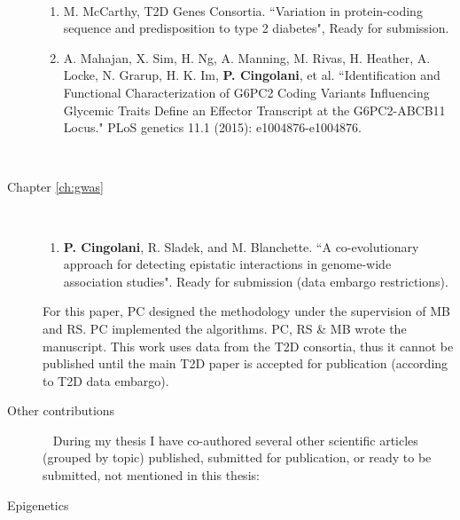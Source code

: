 \begin{description}
		~ \\
			
		\begin{enumerate}[resume]
		
			\item M. McCarthy, T2D Genes Consortia. ``Variation in protein-coding sequence and predisposition to type 2 diabetes", Ready for submission.
			
			\item A. Mahajan, X. Sim, H. Ng, A. Manning, M. Rivas, H. Heather, A. Locke, N. Grarup, H. K. Im, \textbf{P. Cingolani}, et al. ``Identification and Functional Characterization of G6PC2 Coding Variants Influencing Glycemic Traits Define an Effector Transcript at the G6PC2-ABCB11 Locus." PLoS genetics 11.1 (2015): e1004876-e1004876.
		
		\end{enumerate}
		~ \\
	
	\item[Chapter \ref{ch:gwas}] ~
	
		\begin{enumerate}[resume]
		\item \textbf{P. Cingolani}, R. Sladek, and M. Blanchette. ``A co-evolutionary approach for detecting epistatic interactions in genome-wide association studies". Ready for submission (data embargo restrictions).
		\end{enumerate}
	
		For this paper, PC designed the methodology under the supervision of MB and RS. PC implemented the algorithms. PC, RS \& MB wrote the manuscript. This work uses data from the T2D consortia, thus it cannot be published until the main T2D paper is accepted for publication (according to T2D data embargo).
		\\
	
	\item[Other contributions] ~	\linebreak
		During my thesis I have co-authored several other scientific articles (grouped by topic) published, submitted for publication, or ready to be submitted, not mentioned in this thesis:
		\\

	\item[Epigenetics] ~


\end{description}
